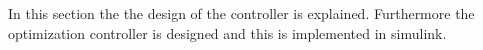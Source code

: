 In this section the the design of the controller is explained. Furthermore the optimization controller is designed and this is implemented in simulink. 


